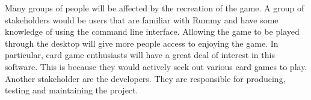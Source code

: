 \documentclass[12pt]{article}
\begin{document}

Many groups of people will be affected by the recreation of the game. A group of stakeholders would be users that are familiar with Rummy and have some knowledge of using the command line interface. Allowing the game to be played through the desktop will give more people access to enjoying the game. In particular, card game enthusiasts will have a great deal of interest in this software. This is because they would actively seek out various card games to play. Another stakeholder are the developers. They are responsible for producing, testing and maintaining the project.
\end{document}
